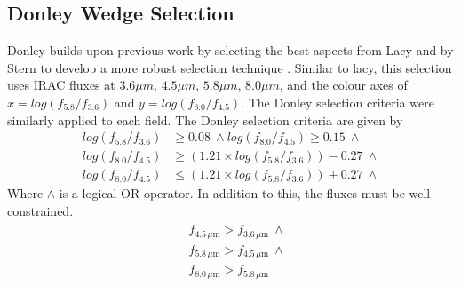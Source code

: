 \documentclass[11pt]{iopart}
\begin{document}
\subsection{Donley Wedge Selection}
Donley builds upon previous work by selecting the best aspects from Lacy \cite{lacy_obscured_2004, lacy_optical_2007} and by Stern \cite{stern_midinfrared_2005} to develop a more robust selection technique \cite{donley_identifying_2012}. Similar to lacy, this selection uses IRAC fluxes at $3.6\mu m$, $4.5\mu m$, $5.8\mu m$, $8.0\mu m$, and the colour axes of $x = log(f_{5.8}/f_{3.6})$ and $y = log(f_{8.0}/f_{4.5})$. The Donley selection criteria were similarly applied to each field. The Donley selection criteria are given by
\begin{align*}
    log(f_{5.8}/f_{3.6}) &\geq 0.08 \ \land log(f_{8.0}/f_{4.5}) \geq 0.15 \ \land\\
    log(f_{8.0}/f_{4.5}) &\geq (1.21 \times log(f_{5.8}/f_{3.6})) - 0.27 \ \land\\
    log(f_{8.0}/f_{4.5}) &\leq (1.21 \times log(f_{5.8}/f_{3.6})) + 0.27 \ \land
\end{align*}
Where $\land$ is a logical OR operator. In addition to this, the fluxes must be well-constrained.
\begin{align*}
    \begin{split}
        &f_{4.5\, \mu\text{m}} > f_{3.6\, \mu\text{m}}\  \land\\ 
        \ &f_{5.8\, \mu\text{m}} > f_{4.5\, \mu\text{m}}\  \land\\
        \ &f_{8.0\, \mu\text{m}} > f_{5.8\, \mu\text{m}}
    \end{split}
\end{align*}
\end{document}

